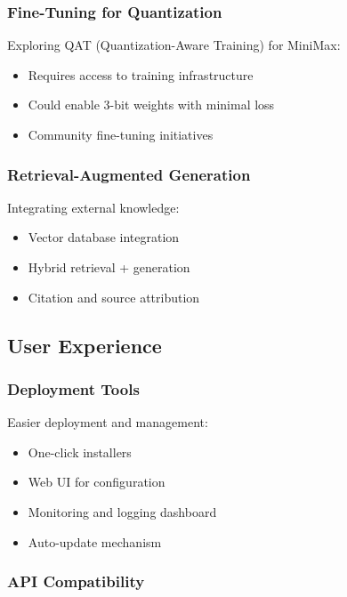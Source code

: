 \subsubsection{Fine-Tuning for Quantization}

Exploring QAT (Quantization-Aware Training) for MiniMax:

\begin{itemize}
    \item Requires access to training infrastructure
    \item Could enable 3-bit weights with minimal loss
    \item Community fine-tuning initiatives
\end{itemize}

\subsubsection{Retrieval-Augmented Generation}

Integrating external knowledge:

\begin{itemize}
    \item Vector database integration
    \item Hybrid retrieval + generation
    \item Citation and source attribution
\end{itemize}

\subsection{User Experience}

\subsubsection{Deployment Tools}

Easier deployment and management:

\begin{itemize}
    \item One-click installers
    \item Web UI for configuration
    \item Monitoring and logging dashboard
    \item Auto-update mechanism
\end{itemize}

\subsubsection{API Compatibility}

